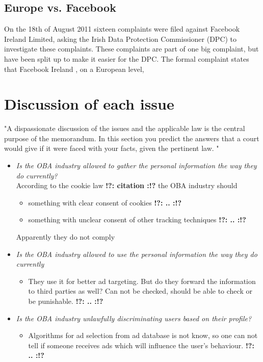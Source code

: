 \documentclass[11pt]{article}
\newcommand{\tocheck}[1]{{\bf !?: #1 :!?}}
\begin{document}
\subsection{Europe vs. Facebook}
On the 18th of August 2011 sixteen complaints were filed against Facebook Ireland Limited, asking the Irish Data Protection Commissioner (DPC) to investigate these complaints. These complaints are part of one big complaint, but have been split up to make it easier for the DPC. The formal complaint states that Facebook Ireland , on a European level, 



\section{Discussion of each issue}
"A dispassionate discussion of the issues and the applicable law is the central purpose of
the memorandum. In this section you predict the answers that a court would give if it
were faced with your facts, given the pertinent law.
"
\begin{itemize}
	\item \textit{Is the OBA industry allowed to gather the personal information the way they do currently?}\\
		According to the cookie law \cite{blabla} \tocheck{citation} the OBA industry should 
			\begin{itemize}
				\item something with clear consent of cookies \tocheck{..}
				\item something with unclear consent of other tracking techniques \tocheck{..}
			\end{itemize}
		Apparently they do not comply
	\item \textit{Is the OBA industry allowed to use the personal information the way they do currently}\\
			\begin{itemize}
				\item They use it for better ad targeting. But do they forward the information to third parties as well? Can not be checked, should be able to check or be punishable. \tocheck{..}
			\end{itemize}
	\item \textit{Is the OBA industry unlawfully discriminating users based on their profile?}\\
			\begin{itemize}
				\item Algorithms for ad selection from ad database is not know, so one can not tell if someone receives ads which will influence the user's behaviour. \tocheck{..}
			\end{itemize}
\end{itemize}
\end{document}
